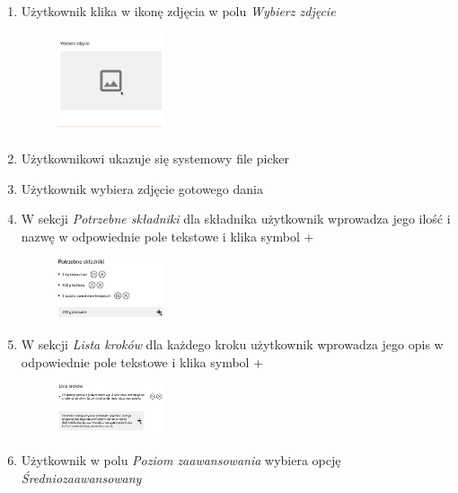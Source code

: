 \documentclass{article}
\begin{document}
\begin{enumerate}
    \item Użytkownik klika w ikonę zdjęcia w polu \textit{Wybierz zdjęcie}
        \begin{figure}[H]
            \begin{center}
                \includegraphics[width=0.3\textwidth]{images/add_recipe_step5}
            \end{center}
        \end{figure}
    \item Użytkownikowi ukazuje się systemowy file picker
    \item Użytkownik wybiera zdjęcie gotowego dania
    \item W sekcji \textit {Potrzebne składniki} dla składnika użytkownik wprowadza jego ilość i nazwę w odpowiednie pole tekstowe i klika symbol +
        \begin{figure}[H]
            \begin{center}
                \includegraphics[width=0.3\textwidth]{images/add_recipe_step6}
            \end{center}
        \end{figure}
    \item W sekcji \textit{Lista kroków} dla każdego kroku użytkownik wprowadza jego opis w odpowiednie pole tekstowe i klika symbol +
        \begin{figure}[H]
            \begin{center}
                \includegraphics[width=0.3\textwidth]{images/add_recipe_step7}
            \end{center}
        \end{figure}
    \item Użytkownik w polu \textit{Poziom zaawansowania} wybiera opcję \textit{Średniozaawansowany}

\end{enumerate}
\end{document}
